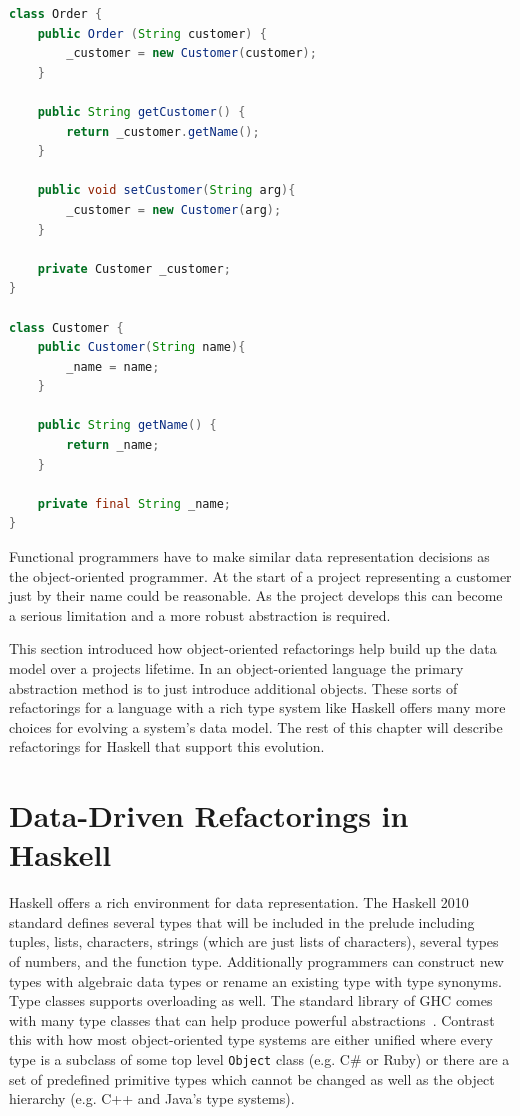 \begin{lstlisting}[caption={The result of the Replace Data Value with Object refactoring when applied to the customer field of the order class.}, language = java, captionpos=b,label=custCls,tabsize=4]
class Order {
	public Order (String customer) {
		_customer = new Customer(customer);	
	}
	
	public String getCustomer() {
		return _customer.getName();
	}
	
	public void setCustomer(String arg){
		_customer = new Customer(arg);	
	}
	
	private Customer _customer;
}

class Customer {
	public Customer(String name){
		_name = name;
	}
	
	public String getName() {
		return _name;
	}
	
	private final String _name;
}
\end{lstlisting}

Functional programmers have to make similar data representation decisions as the object-oriented programmer. At the start of a project representing a customer just by their name could be reasonable. As the project develops this can become a serious limitation and a more robust abstraction is required.

This section introduced how object-oriented refactorings help build up the data model over a projects lifetime. In an object-oriented language the primary abstraction method is to just introduce additional objects. These sorts of refactorings for a language with a rich type system like  Haskell offers many more choices for evolving a system's data model. The rest of this chapter will describe refactorings for Haskell that support this evolution.  

\section{Data-Driven Refactorings in Haskell}

Haskell offers a rich environment for data representation. The Haskell 2010 standard defines several types that will be included in the prelude including tuples, lists, characters, strings (which are just lists of characters), several types of numbers, and the function type. Additionally programmers can construct new types with algebraic data types or rename an existing type with type synonyms. Type classes supports overloading as well. The standard library of GHC comes with many type classes that can help produce powerful abstractions~\citep{typeclassopedia}. Contrast this with how most object-oriented type systems are either unified where every type is a subclass of some top level \texttt{Object} class (e.g. C\# or Ruby) or there are a set of predefined primitive types which cannot be changed as well as the object hierarchy (e.g. C++ and Java's type systems). 

